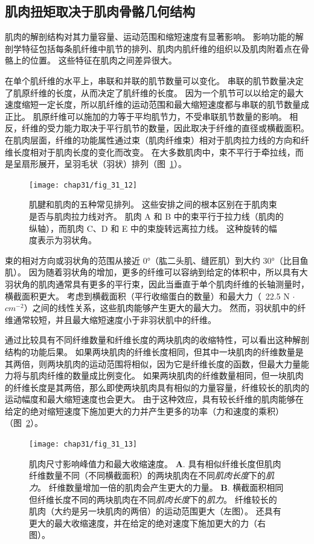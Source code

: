 \subsection{肌肉扭矩取决于肌肉骨骼几何结构}

肌肉的解剖结构对其力量容量、运动范围和缩短速度有显著影响。
影响功能的解剖学特征包括每条肌纤维中肌节的排列、肌肉内肌纤维的组织以及肌肉附着点在骨骼上的位置。
这些特征在肌肉之间差异很大。


在单个肌纤维的水平上，串联和并联的肌节数量可以变化。
串联的肌节数量决定了肌原纤维的长度，从而决定了肌纤维的长度。
因为一个肌节可以以给定的最大速度缩短一定长度，所以肌纤维的运动范围和最大缩短速度都与串联的肌节数量成正比。
肌原纤维可以施加的力等于平均肌节力，不受串联肌节数量的影响。
相反，纤维的受力能力取决于平行肌节的数量，因此取决于纤维的直径或横截面积。
在肌肉层面，纤维的功能属性通过束（肌肉纤维束）相对于肌肉拉力线的方向和纤维长度相对于肌肉长度的变化而改变。
在大多数肌肉中，束不平行于牵拉线，而是呈扇形展开，呈羽毛状（羽状）排列（图~\ref{fig:31_12}）。


\begin{figure}[htbp]
	\centering
	\texttt{[image: chap31/fig\_31\_12]}
	\caption{肌腱和肌肉的五种常见排列。
	这些安排之间的根本区别在于肌肉束是否与肌肉拉力线对齐。
	肌肉 A 和 B 中的束平行于拉力线（肌肉的纵轴），而肌肉 C、D 和 E 中的束旋转远离拉力线。
	这种旋转的幅度表示为羽状角\cite{winters2012multiple}。}
	\label{fig:31_12}
\end{figure}


束的相对方向或羽状角的范围从接近 0°（肱二头肌、缝匠肌）到大约 30°（比目鱼肌）。
因为随着羽状角的增加，更多的纤维可以容纳到给定的体积中，所以具有大羽状角的肌肉通常具有更多的平行束，因此当垂直于单个肌肉纤维的长轴测量时，横截面积更大。
考虑到横截面积（平行收缩蛋白的数量）和最大力（~22.5 N $\cdot$ $ cm^{-2} $）之间的线性关系，这些肌肉能够产生更大的最大力。
然而，羽状肌中的纤维通常较短，并且最大缩短速度小于非羽状肌中的纤维。


通过比较具有不同纤维数量和纤维长度的两块肌肉的收缩特性，可以看出这种解剖结构的功能后果。
如果两块肌肉的纤维长度相同，但其中一块肌肉的纤维数量是其两倍，则两块肌肉的运动范围将相似，因为它是纤维长度的函数，但最大力量能力将与肌肉纤维的数量成比例变化。
如果两块肌肉的纤维数量相同，但一块肌肉的纤维长度是其两倍，那么即使两块肌肉具有相似的力量容量，纤维较长的肌肉的运动幅度和最大缩短速度也会更大。
由于这种效应，具有较长纤维的肌肉能够在给定的绝对缩短速度下施加更大的力并产生更多的功率（力和速度的乘积）（图~\ref{fig:31_13}）。


\begin{figure}[htbp]
	\centering
	\texttt{[image: chap31/fig\_31\_13]}
	\caption{肌肉尺寸影响峰值力和最大收缩速度\cite{lieber2000functional}。
	\textbf{A}. 具有相似纤维长度但肌肉纤维数量不同（不同横截面积）的两块肌肉在不同\textit{肌肉长度}下的\textit{肌力}。
	纤维数量增加一倍的肌肉会产生更大的力量。
	\textbf{B}. 横截面积相同但纤维长度不同的两块肌肉在不同\textit{肌肉长度}下的\textit{肌力}。
	纤维较长的肌肉（大约是另一块肌肉的两倍）的运动范围更大（左图）。 
	还具有更大的最大收缩速度，并在给定的绝对速度下施加更大的力（右图）。}
	\label{fig:31_13}
\end{figure}


